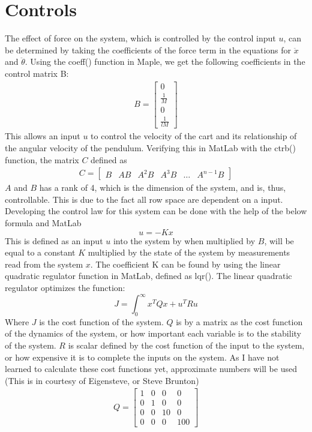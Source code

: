 \documentclass{article}
\begin{document}
\section{Controls}
The effect of force on the system, which is controlled by the control input $u$, can be determined by taking the coefficients
of the force term in the equations for $\ddot{x}$ and $\ddot{\theta}$. Using the coeff() function in Maple, we get the following 
coefficients in the control matrix B:
\begin{align*}
    B = \begin{bmatrix}
        0 \\
        \frac{1}{M} \\
        0 \\
        \frac{1}{lM}
    \end{bmatrix}
\end{align*}
This allows an input $u$ to control the velocity of the cart and its relationship of the angular velocity of the 
pendulum. Verifying this in MatLab with the ctrb() function, the matrix $C$ defined as 
\begin{align*}
    C = \begin{bmatrix}
        B & AB & A^2B & A^3B & \dots & A^{n-1}B
    \end{bmatrix}
\end{align*}
$A$ and $B$ has a rank of 4, which is the dimension of the system, and is, thus, controllable. This is due to the fact
all row space are dependent on a input. Developing the control law for this system can be done with the help of
the below formula and MatLab
\[u = -Kx\]
This is defined as an input $u$ into the system by when multiplied by $B$, will be equal to a constant $K$
multiplied by the state of the system by measurements read from the system $x$. The coefficient K can be 
found by using the linear quadratic regulator function in MatLab, defined as lqr(). The linear quadratic regulator
optimizes the function:
\[J=\int_0^{\infty}{x^TQx+u^TRu}\]
Where $J$ is the cost function of the system. $Q$ is by a matrix as the cost function of the dynamics of the system, 
or how important each variable is to the stability of the system. $R$ is scalar defined by the cost function of the 
input to the system, or how expensive it is to complete the inputs on the system. As I have not learned to 
calculate these cost functions yet, approximate numbers will be used (This is in courtesy of Eigensteve, or Steve Brunton)
\begin{align*}
    Q = \begin{bmatrix}
        1 & 0 & 0 & 0 \\
        0 & 1 & 0 & 0 \\
        0 & 0 & 10 & 0 \\
        0 & 0 & 0 & 100
    \end{bmatrix}
\end{align*}
\end{document}
